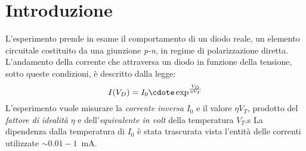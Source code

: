\documentclass[@SRC@/main]{subfiles}
\begin{document}
    \section{Introduzione} \label{sec:introduzione}
    L'esperimento prende in esame il comportamento di un diodo reale, un elemento circuitale
    costituito da una giunzione \textit{p-n}, in regime di polarizzazione diretta.
    L'andamento della corrente che attraversa un diodo in funzione della tensione,
    sotto queste condizioni, è descritto dalla legge:
    \begin{equation}
        \label{eq:caratteristiche}
        I(V_D) = I_0\cdote \exp^{\frac{V_D}{\eta V_T}}
    \end{equation}
    L'esperimento vuole misurare la \textit{corrente inversa} $I_0$ e il valore
    $\eta V_T$, prodotto del \textit{fattore di idealità} $\eta$ e
    dell'\textit{equivalente in volt} della temperatura $V_T$.s
    La dipendenza dalla temperatura di $I_0$ è stata trascurata vista l'entità
    delle correnti utilizzate $\sim 0.01-1$~mA.
\end{document}

